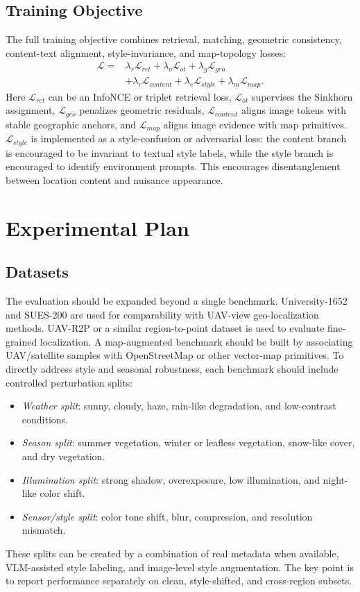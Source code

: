 \documentclass[journal]{IEEEtran}
\begin{document}
\subsection{Training Objective}
The full training objective combines retrieval, matching, geometric consistency, content-text alignment, style-invariance, and map-topology losses:
\begin{equation}
\begin{aligned}
  \mathcal{L} =
  &\lambda_r\mathcal{L}_{ret}
  +\lambda_o\mathcal{L}_{ot}
  +\lambda_g\mathcal{L}_{geo} \\
  &+\lambda_c\mathcal{L}_{content}
  +\lambda_e\mathcal{L}_{style}
  +\lambda_m\mathcal{L}_{map}.
\end{aligned}
\end{equation}
Here $\mathcal{L}_{ret}$ can be an InfoNCE or triplet retrieval loss, $\mathcal{L}_{ot}$ supervises the Sinkhorn assignment, $\mathcal{L}_{geo}$ penalizes geometric residuals, $\mathcal{L}_{content}$ aligns image tokens with stable geographic anchors, and $\mathcal{L}_{map}$ aligns image evidence with map primitives. $\mathcal{L}_{style}$ is implemented as a style-confusion or adversarial loss: the content branch is encouraged to be invariant to textual style labels, while the style branch is encouraged to identify environment prompts. This encourages disentanglement between location content and nuisance appearance.

\section{Experimental Plan}

\subsection{Datasets}
The evaluation should be expanded beyond a single benchmark. University-1652 \cite{university1652} and SUES-200 are used for comparability with UAV-view geo-localization methods. UAV-R2P \cite{r2ploc2025} or a similar region-to-point dataset is used to evaluate fine-grained localization. A map-augmented benchmark should be built by associating UAV/satellite samples with OpenStreetMap or other vector-map primitives. To directly address style and seasonal robustness, each benchmark should include controlled perturbation splits:
\begin{itemize}
  \item \emph{Weather split}: sunny, cloudy, haze, rain-like degradation, and low-contrast conditions.
  \item \emph{Season split}: summer vegetation, winter or leafless vegetation, snow-like cover, and dry vegetation.
  \item \emph{Illumination split}: strong shadow, overexposure, low illumination, and night-like color shift.
  \item \emph{Sensor/style split}: color tone shift, blur, compression, and resolution mismatch.
\end{itemize}
These splits can be created by a combination of real metadata when available, VLM-assisted style labeling, and image-level style augmentation. The key point is to report performance separately on clean, style-shifted, and cross-region subsets.
\end{document}
